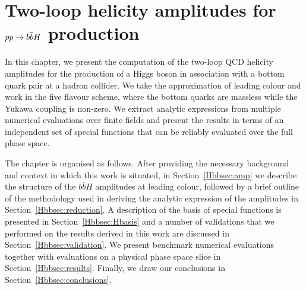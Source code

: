 \documentclass[main.tex]{subfiles}
\begin{document}
\chapter{Two-loop helicity amplitudes for $pp \rightarrow b\bar{b}H$ production} \label{sec:Hbb}
In this chapter, we present the computation of the two-loop QCD helicity amplitudes for the production of a Higgs boson in association with a bottom quark pair at a hadron collider. We take the approximation of leading colour and work in the five flavour scheme, where the bottom quarks are massless while the Yukawa coupling is non-zero. We extract analytic expressions from multiple numerical evaluations over finite fields and present the results in terms of an independent set of special functions that can be reliably evaluated over the full phase space.

The chapter is organised as follows. After providing the necessary background and context in which this work is situated, in Section~\ref{Hbbsec:amp} we describe the structure of the $b\bar{b}H$ amplitudes at leading colour, followed by a brief outline of the methodology used in deriving the analytic expression of the amplitudes in Section~\ref{Hbbsec:reduction}. A description of the basis of special functions is presented in Section~\ref{Hbbsec:Hbasis} and a number of validations that we performed on the results derived in this work are discussed in Section~\ref{Hbbsec:validation}. We present benchmark numerical evaluations together with evaluations on a physical phase space slice in Section~\ref{Hbbsec:results}. Finally, we draw our conclusions in Section~\ref{Hbbsec:conclusions}. 
\end{document}
